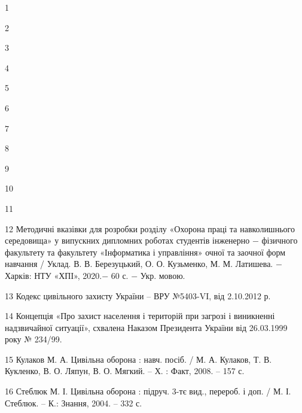 
\hspace*{26pt} 1 

2 

3

4 

5 

6 

7 

8 

9 

10 

11 

12 Методичні вказівки для розробки розділу «Охорона праці та навколишнього середовища» у випускних дипломних роботах студентів інженерно $-$ фізичного факультету та факультету «Інформатика і управління» очної та заочної форм навчання / Уклад. В. В. Березуцький, О. О. Кузьменко, М. М. Латишева. $-$ Харків: НТУ «ХПІ», 2020.$-$ 60 с. $-$ Укр. мовою.

13 Кодекс цивільного захисту України – ВРУ №5403-VI, від 2.10.2012 р.

14 Концепція «Про захист населення і територій при загрозі і виникненні надзвичайної ситуації», схвалена Наказом Президента України від 26.03.1999 року № 234/99.

15 Кулаков М. А. Цивільна оборона : навч. посіб. / М. А. Кулаков, Т. В. Кукленко, В. О. Ляпун, В. О. Мягкий. – Х. : Факт, 2008. – 157 с.

16 Стеблюк М. І. Цивільна оборона  : підруч. 3-тє вид., перероб. і доп. / М. І. Стеблюк. – К.: Знання, 2004. – 332 с.

